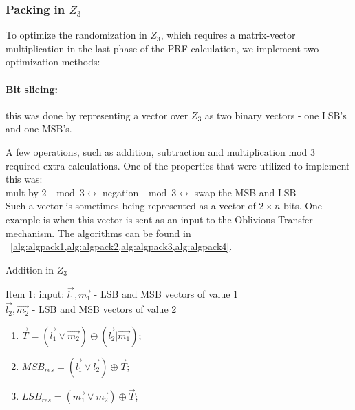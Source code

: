 \subsubsection{Packing in $Z_3$}

To optimize the randomization in $Z_3$, which requires a matrix-vector multiplication in the last phase of the PRF calculation, we implement two optimization methods:

\paragraph{Bit slicing:} this was done by representing a vector over $Z_3$  as two binary vectors - one LSB's and one MSB's. 

A few operations, such as addition, subtraction and multiplication mod 3 required extra calculations. One of the properties that were utilized to implement this was:\\
mult-by-2 $\mod 3  \leftrightarrow$ negation $ \mod 3 \leftrightarrow$ swap the MSB and LSB\\

Such a vector is sometimes being represented as a vector of $2 \times n$ bits. One example is when this vector is sent as an input to the Oblivious Transfer mechanism. 
The algorithms can be found in ~\cref{alg:algpack1,alg:algpack2,alg:algpack3,alg:algpack4}.


\begin{algorithm}
	\caption{Addition in $Z_3$}
		\label{alg:algpack1}  Item 1:
		input: $\vec{l_1}, \vec{m_1}$ - LSB and MSB vectors of value 1  \\
		  	  	$\vec{l_2}, \vec{m_2}$ - LSB and MSB vectors of value 2
		
\begin{enumerate}

	\item $\vec{T} = (\vec{l_1} \lor \vec{m_2}) \oplus (\vec{l_2} | \vec{m_1})$;
	\item $MSB_{res} = ( \vec{l_1} \lor \vec{l_2} ) \oplus  \vec{T} $;
	\item $LSB_{res} = (\vec{m_1} \lor \vec{m_2} ) \oplus \vec{T} $;
	
	\end{enumerate}
	
\end{algorithm}

